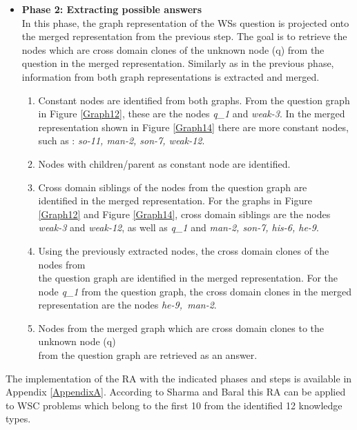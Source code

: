 \begin{itemize}
	\item \textbf{Phase 2: Extracting possible answers}\\
	In this phase, the graph representation of the WSs question is projected onto the merged representation from the previous step. The goal is to retrieve the nodes which are cross domain clones of the unknown node (q) from the question in the merged representation. Similarly as in the previous phase, information from both graph representations is extracted and merged.
	\begin{enumerate}
		\item Constant nodes are identified from both graphs. From the question graph in Figure \ref{Graph12}, these are the nodes \textit{q\_1} and \textit{weak-3}. In the merged representation shown in Figure \ref{Graph14} there are more constant nodes, such as : \textit{so-11, man-2, son-7, weak-12}.
		\item Nodes with children/parent as constant node are identified. 
		\item Cross domain siblings of the nodes from the question graph are \\ identified in the merged representation. For the graphs in Figure \ref{Graph12} and Figure \ref{Graph14}, cross domain siblings are the nodes \textit{weak-3} and \textit{weak-12}, as well as \textit{q\_1} and \textit{man-2, son-7, his-6, he-9}. 
		\item Using the previously extracted nodes, the cross domain clones of the nodes from\\ the question graph are identified in the merged representation. For the node \textit{q\_1} from the question graph, the cross domain clones in the merged representation are the nodes \textit{he-9,~man-2}.
		\item Nodes from the merged graph which are cross domain clones to the unknown node (q)\\ from the question graph are retrieved as an answer.
	\end{enumerate}
\end{itemize}

The implementation of the RA with the indicated phases and steps is available in Appendix \ref{AppendixA}. 
According to Sharma and Baral \cite{2018CommonsenseKT} this RA can be applied to WSC problems which belong to the first 10 from the identified 12 knowledge types. 

